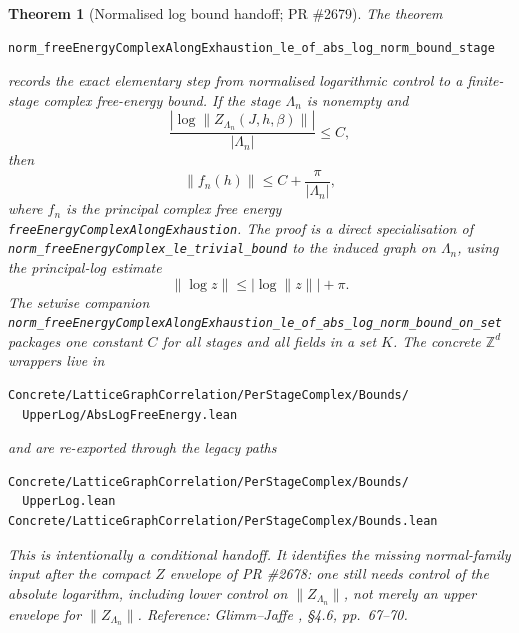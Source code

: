 \documentclass[a4paper,11pt]{article}
\newtheorem{theorem}{Theorem}
\begin{document}
\begin{theorem}[Normalised log bound handoff; PR \#2679]
The theorem
\begin{Verbatim}[fontsize=\small, breaklines=true]
norm_freeEnergyComplexAlongExhaustion_le_of_abs_log_norm_bound_stage
\end{Verbatim}
records the exact elementary step from normalised logarithmic control to a
finite-stage complex free-energy bound.  If the stage $\Lambda_n$ is nonempty
and
\[
  \frac{\left|\log\|Z_{\Lambda_n}(J,h,\beta)\|\right|}{|\Lambda_n|}
  \le C,
\]
then
\[
  \|f_n(h)\|
  \le
  C+\frac{\pi}{|\Lambda_n|},
\]
where $f_n$ is the principal complex free energy
\texttt{freeEnergyComplexAlongExhaustion}.  The proof is a direct
specialisation of
\texttt{norm\_freeEnergyComplex\_le\_trivial\_bound} to the induced graph on
$\Lambda_n$, using the principal-log estimate
\[
  \|\log z\|\le |\log\|z\||+\pi .
\]
The setwise companion
\texttt{norm\_freeEnergyComplexAlongExhaustion\_le\_of\_abs\_log\_norm\_bound\_on\_set}
packages one constant $C$ for all stages and all fields in a set $K$.  The
concrete $\mathbb Z^d$ wrappers live in
\begin{Verbatim}[fontsize=\footnotesize]
Concrete/LatticeGraphCorrelation/PerStageComplex/Bounds/
  UpperLog/AbsLogFreeEnergy.lean
\end{Verbatim}
and are re-exported through the legacy paths
\begin{Verbatim}[fontsize=\footnotesize]
Concrete/LatticeGraphCorrelation/PerStageComplex/Bounds/
  UpperLog.lean
Concrete/LatticeGraphCorrelation/PerStageComplex/Bounds.lean
\end{Verbatim}

This is intentionally a conditional handoff.  It identifies the missing
normal-family input after the compact $Z$ envelope of PR \#2678: one still
needs control of the absolute logarithm, including lower control on
\(\|Z_{\Lambda_n}\|\), not merely an upper envelope for
\(\|Z_{\Lambda_n}\|\).  Reference: Glimm--Jaffe \cite{glimm-jaffe},
\S 4.6, pp.~67--70.
\end{theorem}
\end{document}
